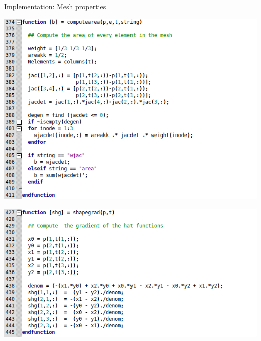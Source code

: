 \documentclass[aspectratio=54,xcolor=dvipsnames]{beamer}
\begin{document}
\begin{frame}{Implementation: Mesh properties}
    \begin{center}
        \begin{minipage}{0.58\textwidth}
            \centering
            \includegraphics[width=\textwidth]{Images/msh_area.png}
        \end{minipage}\hfill
        \begin{minipage}{0.58\textwidth}
            \centering
            \includegraphics[width=\textwidth]{Images/msh_gradient.png}
        \end{minipage}
    \end{center}
\end{frame}
\end{document}
